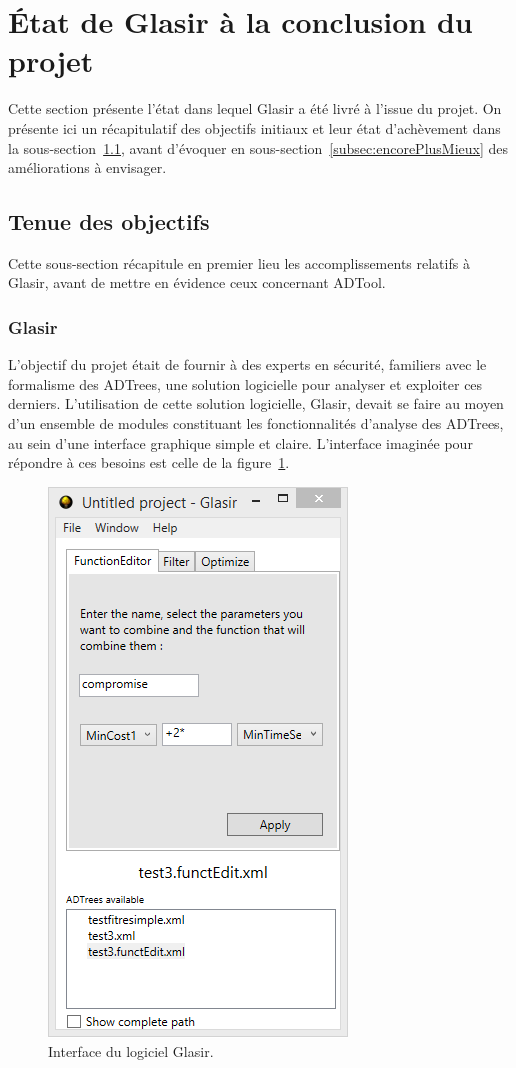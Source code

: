 \section{État de Glasir à la conclusion du projet}
\label{sec:etatFinal}

Cette section présente l'état dans lequel Glasir a été livré à l'issue du projet. On présente ici un récapitulatif des objectifs initiaux et leur état d'achèvement dans la {\sc sous-section}~\ref{subsec:objOK}, avant d'évoquer en {\sc sous-section}~\ref{subsec:encorePlusMieux} des améliorations à envisager.

\subsection{Tenue des objectifs}
\label{subsec:objOK}

Cette sous-section récapitule en premier lieu les accomplissements relatifs à Glasir, avant de mettre en évidence ceux concernant ADTool.

\subsubsection{Glasir}
\label{sssec:obj_glasir}

L'objectif du projet était de fournir à des experts en sécurité, familiers avec le formalisme des ADTrees, une solution logicielle pour analyser et exploiter ces derniers. L'utilisation de cette solution logicielle, Glasir, devait se faire au moyen d'un ensemble de \og modules \fg{} constituant les fonctionnalités d'analyse des ADTrees, au sein d'une interface graphique simple et claire. L'interface imaginée pour répondre à ces besoins est celle de la {\sc figure}~\ref{fig:InterfaceGlasir}.

    \begin{figure}[H]
        \centering
        \includegraphics[height=0.75\textwidth]{figure/interface.png}
        \caption{Interface du logiciel Glasir.}
        \label{fig:InterfaceGlasir}
    \end{figure}

